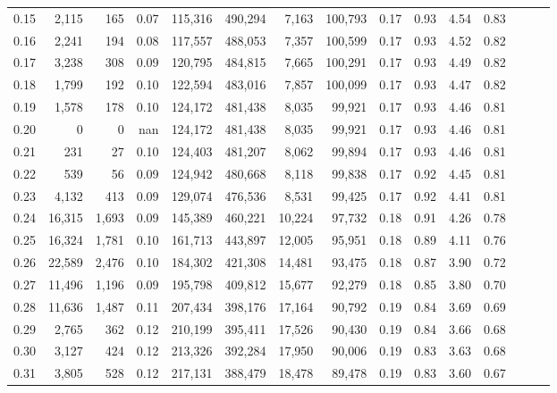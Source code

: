 \begin{tabular}{rrrrrrrrrrrrrrr}
0.15 &   2,115 &    165 &  0.07 &  115,316 &  490,294 &    7,163 &  100,793 &  0.17 &  0.93 &  4.54 &      0.83 \\
0.16 &   2,241 &    194 &  0.08 &  117,557 &  488,053 &    7,357 &  100,599 &  0.17 &  0.93 &  4.52 &      0.82 \\
0.17 &   3,238 &    308 &  0.09 &  120,795 &  484,815 &    7,665 &  100,291 &  0.17 &  0.93 &  4.49 &      0.82 \\
0.18 &   1,799 &    192 &  0.10 &  122,594 &  483,016 &    7,857 &  100,099 &  0.17 &  0.93 &  4.47 &      0.82 \\
0.19 &   1,578 &    178 &  0.10 &  124,172 &  481,438 &    8,035 &   99,921 &  0.17 &  0.93 &  4.46 &      0.81 \\
0.20 &       0 &      0 &   nan &  124,172 &  481,438 &    8,035 &   99,921 &  0.17 &  0.93 &  4.46 &      0.81 \\
0.21 &     231 &     27 &  0.10 &  124,403 &  481,207 &    8,062 &   99,894 &  0.17 &  0.93 &  4.46 &      0.81 \\
0.22 &     539 &     56 &  0.09 &  124,942 &  480,668 &    8,118 &   99,838 &  0.17 &  0.92 &  4.45 &      0.81 \\
0.23 &   4,132 &    413 &  0.09 &  129,074 &  476,536 &    8,531 &   99,425 &  0.17 &  0.92 &  4.41 &      0.81 \\
0.24 &  16,315 &  1,693 &  0.09 &  145,389 &  460,221 &   10,224 &   97,732 &  0.18 &  0.91 &  4.26 &      0.78 \\
0.25 &  16,324 &  1,781 &  0.10 &  161,713 &  443,897 &   12,005 &   95,951 &  0.18 &  0.89 &  4.11 &      0.76 \\
0.26 &  22,589 &  2,476 &  0.10 &  184,302 &  421,308 &   14,481 &   93,475 &  0.18 &  0.87 &  3.90 &      0.72 \\
0.27 &  11,496 &  1,196 &  0.09 &  195,798 &  409,812 &   15,677 &   92,279 &  0.18 &  0.85 &  3.80 &      0.70 \\
0.28 &  11,636 &  1,487 &  0.11 &  207,434 &  398,176 &   17,164 &   90,792 &  0.19 &  0.84 &  3.69 &      0.69 \\
0.29 &   2,765 &    362 &  0.12 &  210,199 &  395,411 &   17,526 &   90,430 &  0.19 &  0.84 &  3.66 &      0.68 \\
0.30 &   3,127 &    424 &  0.12 &  213,326 &  392,284 &   17,950 &   90,006 &  0.19 &  0.83 &  3.63 &      0.68 \\
0.31 &   3,805 &    528 &  0.12 &  217,131 &  388,479 &   18,478 &   89,478 &  0.19 &  0.83 &  3.60 &      0.67 \\

\end{tabular}
